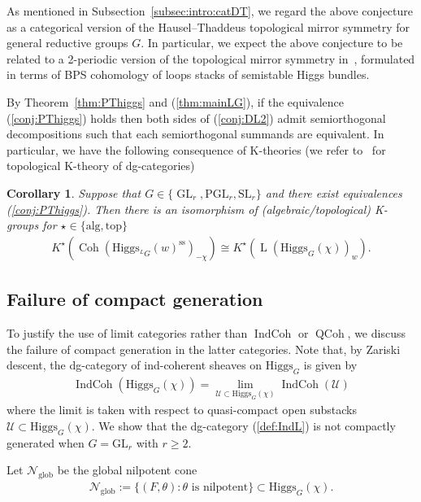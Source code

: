 \documentclass [11pt,oneside,a4paper,mathscr]{amsart}
\newtheorem{cor}[thm]{Corollary}
\theoremstyle{definition}
\renewcommand{\geq}{\geqslant}
\newcommand{\LL}{\operatorname{L}}
\newcommand{\QCoh}{\operatorname{QCoh}}
\newcommand{\Coh}{\operatorname{Coh}}
\newcommand{\IndCoh}{\operatorname{IndCoh}}
\newcommand{\GL}{\operatorname{GL}}
\newcommand{\Hig}{\mathrm{Higgs}}
\begin{document}
As mentioned in Subsection~\ref{subsec:intro:catDT}, we regard the above conjecture as a categorical version of the Hausel--Thaddeus topological mirror symmetry for general reductive groups $G$. In particular, we expect the above conjecture to be related to a 2-periodic version of the topological mirror symmetry in~\cite[Conjecture 10.3.18]{BDIKP}, formulated in terms of BPS cohomology of loops stacks of semistable Higgs bundles.

\smallskip

By Theorem~\ref{thm:PThiggs} and (\ref{thm:mainLG}),
if the equivalence (\ref{conj:PThiggs}) holds
then both sides of (\ref{conj:DL2}) admit semiorthogonal 
decompositions such that each semiorthogonal summands are 
equivalent. In particular, we have the following consequence of K-theories
(we refer to~\cite{Blanc} for topological K-theory of dg-categories)
\begin{cor}\label{cor:Kth}
Suppose that 
$G \in \{\GL_r, \mathrm{PGL}_r, \mathrm{SL}_r\}$
and there exist equivalences (\ref{conj:PThiggs}).
    Then there is an isomorphism of (algebraic/topological) K-groups
    for $\star \in \{\mathrm{alg}, \mathrm{top}\}$
    \begin{align}\label{isom:K}
       K^{\star}(\Coh(\Hig_{^{L}G}(w)^{\mathrm{ss}})_{-\chi}) \cong K^{\star}(\LL(\Hig_{G}(\chi))_{w}). 
    \end{align}
\end{cor}




\subsection{Failure of compact generation}
To justify the use of limit categories rather than $\IndCoh$ or $\QCoh$, we discuss the failure of compact generation in the latter categories.
 Note that, by Zariski 
descent, the dg-category of ind-coherent sheaves on $\Hig_G$ is given by 
\begin{align}\label{def:IndL}
    \IndCoh(\Hig_G(\chi))
   =
    \lim_{\mathcal{U}\subset \Hig_G(\chi)}
    \IndCoh(\mathcal{U})
\end{align}
where the  limit is taken with respect 
to quasi-compact open substacks $\mathcal{U} \subset \Hig_G(\chi)$. 
We show that the dg-category 
(\ref{def:IndL}) is not compactly generated when $G=\mathrm{GL}_r$ with $r \geq 2$.

Let $\mathcal{N}_{\mathrm{glob}}$ be the global nilpotent 
cone
\begin{align*}
    \mathcal{N}_{\mathrm{glob}}:=\{(F, \theta) : \theta \mbox{ is nilpotent}\}
    \subset \Hig_G(\chi). 
\end{align*}
\end{document}
